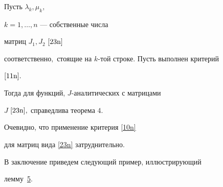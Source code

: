\smallskip



\hypertarget{nik:lemma5}{}



\begin{lemma}[5]Пусть $\lambda_k,\mu_k,$

 $k=1,\ldots,n$ --- собственные  числа

   матриц $J_1,J_2$  $\eqref{23n}$

  соответственно$,$  стоящие на $k$-той строке$.$ Пусть выполнен критерий

   $\eqref{11n}.$

  Тогда для  функций, $J$-аналитических с матрицами

  $J$ $\eqref{23n},$ справедлива теорема $4.$

  \end{lemma}



\smallskip



Очевидно, что применение критерия \eqref{10n}

для матриц вида \eqref{23n}  затруднительно.

В заключение приведем следующий пример, иллюстрирующий

лемму~\hyperlink{nik:lemma5}{5}.





\smallskip



